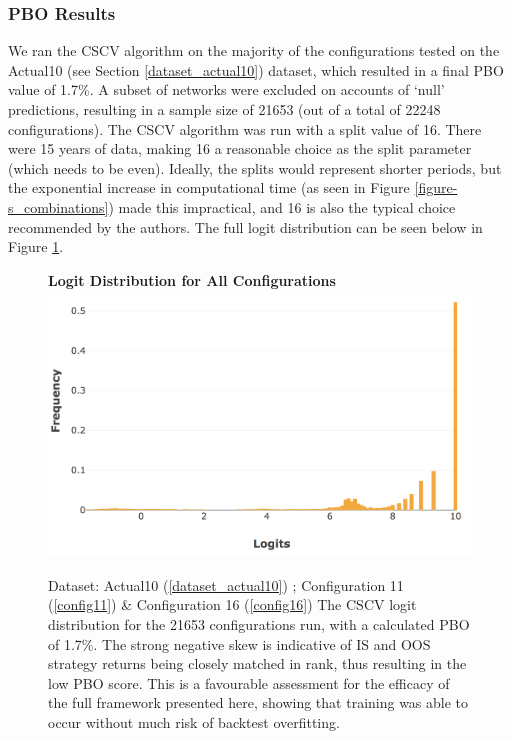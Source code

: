 \documentclass[a4paper,11pt,oneside]{article}
\theoremstyle{plain}
\theoremstyle{definition}
\begin{document}
	
	\subsubsection{PBO Results}\label{results_pbo_stats}
	
	We ran the CSCV algorithm on the majority of the configurations tested on the Actual10 (see Section \ref{dataset_actual10}) dataset, which resulted in a final PBO value of 1.7\%. A subset of networks were excluded on accounts of `null' predictions, resulting in a sample size of 21653 (out of a total of 22248 configurations). The CSCV algorithm was run with a split value of 16. There were 15 years of data, making 16 a reasonable choice as the split parameter (which needs to be even). Ideally, the splits would represent shorter periods, but the exponential increase in computational time (as seen in Figure \ref{figure-s_combinations}) made this impractical, and 16 is also the typical choice recommended by the authors. The full logit distribution can be seen below in Figure \ref{figure-results_logits_all}.
	
	\begin{figure}[H]
		\centering 
		\textbf{Logit Distribution for All Configurations}
		\includegraphics[scale=0.4]{images/results/8_9_pbo/all_sets_dist.png} 
		\caption[Logit Distribution for All Configurations]{Dataset: Actual10 (\ref{dataset_actual10}) ; Configuration 11 (\ref{config11}) \&  Configuration 16 (\ref{config16})
			\newline The CSCV logit distribution for the 21653 configurations run, with a calculated PBO of 1.7\%. The strong negative skew is indicative of IS and OOS strategy returns being closely matched in rank, thus resulting in the low PBO score. This is a favourable assessment for the efficacy of the full framework presented here, showing that training was able to occur without much risk of backtest overfitting. }
		\label{figure-results_logits_all}
	\end{figure}
	
\end{document}
